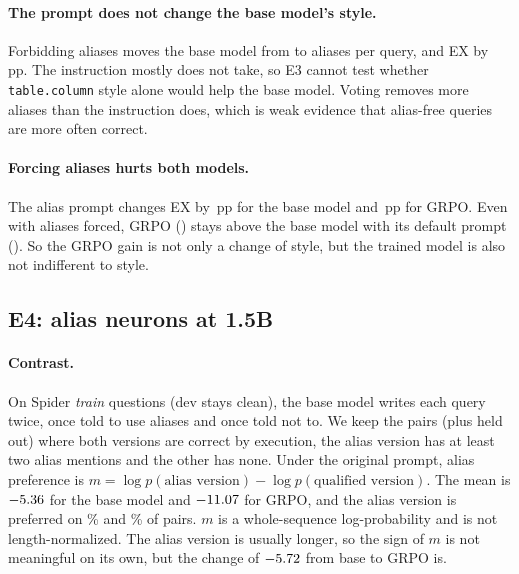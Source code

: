 \documentclass[11pt]{article}
\newcommand{\pp}{\,pp}
\begin{document}
\paragraph{The prompt does not change the base model's style.} Forbidding
aliases moves the base model from \EthreeSBDefGAlias{} to \EthreeSBNoGAlias{}
aliases per query, and EX by \dEthreeNoSBTs\pp{}. The instruction mostly does
not take, so E3 cannot test whether \texttt{table.column} style alone would
help the base model. Voting removes more aliases than the instruction does,
which is weak evidence that alias-free queries are more often correct.

\paragraph{Forcing aliases hurts both models.} The alias prompt changes EX by
\dEthreeAlSBTs\pp{} for the base model and \dEthreeAlSRTs\pp{} for GRPO. Even with
aliases forced, GRPO (\EthreeSRAlGTs) stays above the base model with its
default prompt (\EthreeSBDefGTs). So the GRPO gain is not only a change of
style, but the trained model is also not indifferent to style.

\subsection{E4: alias neurons at 1.5B}
\label{sec:e4}

\paragraph{Contrast.} On Spider \emph{train} questions (dev stays clean), the
base model writes each query twice, once told to use aliases and once told not
to. We keep the \EfourPairs{} pairs (plus \EfourScreenPairs{} held out) where
both versions are correct by execution, the alias version has at least two
alias mentions and the other has none. Under the original prompt, alias
preference is $m = \log p(\text{alias version}) - \log p(\text{qualified
version})$. The mean is $-5.36$ for the base model and $-11.07$ for
GRPO, and the alias version is preferred on \EfourPrefAliasBase\% and
\EfourPrefAliasRl\% of pairs. $m$ is a whole-sequence log-probability and is not
length-normalized. The alias version is usually longer, so the sign of $m$ is
not meaningful on its own, but the change of $-5.72$ from base to GRPO is.
\end{document}
